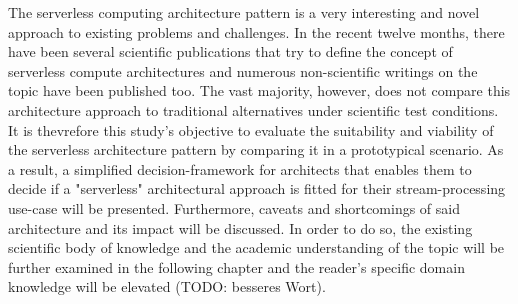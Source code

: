 The serverless computing architecture pattern is a very interesting and novel approach to existing problems and challenges. In the recent twelve months, there have been several scientific publications that try to define the concept of serverless compute architectures and numerous non-scientific writings on the topic have been published too. The vast majority, however, does not compare this architecture approach to traditional alternatives under scientific test conditions. \\
It is thevrefore this study's objective to evaluate the suitability and viability of the serverless architecture pattern by comparing it in a prototypical scenario. As a result, a simplified decision-framework for architects that enables them to decide if a "serverless" architectural approach is fitted for their stream-processing use-case will be presented. Furthermore, caveats and shortcomings of said architecture and its impact will be discussed. 
In order to do so, the existing scientific body of knowledge and the academic understanding of the topic will be further examined in the following chapter and the reader's specific domain knowledge will be elevated (TODO: besseres Wort). 